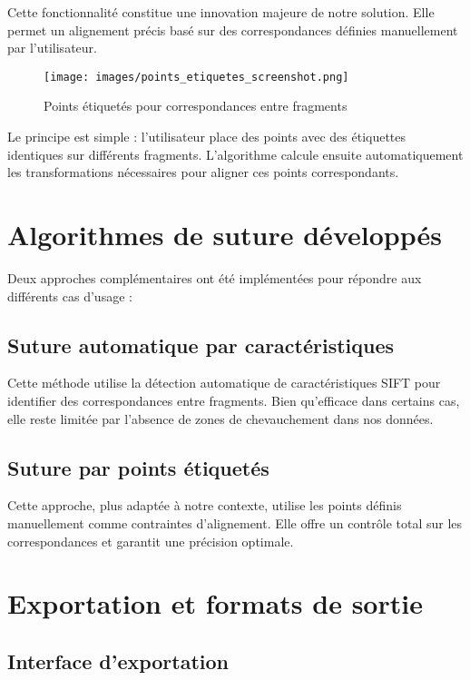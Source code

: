 \documentclass[11pt,a4paper]{report}
\begin{document}
Cette fonctionnalité constitue une innovation majeure de notre solution. Elle permet un alignement précis basé sur des correspondances définies manuellement par l'utilisateur.

\begin{figure}[htbp]
\centering
\texttt{[image: images/points\_etiquetes\_screenshot.png]}
\caption{Points étiquetés pour correspondances entre fragments}
\end{figure}

Le principe est simple : l'utilisateur place des points avec des étiquettes identiques sur différents fragments. L'algorithme calcule ensuite automatiquement les transformations nécessaires pour aligner ces points correspondants.

\section{Algorithmes de suture développés}

Deux approches complémentaires ont été implémentées pour répondre aux différents cas d'usage :

\subsection{Suture automatique par caractéristiques}

Cette méthode utilise la détection automatique de caractéristiques SIFT pour identifier des correspondances entre fragments. Bien qu'efficace dans certains cas, elle reste limitée par l'absence de zones de chevauchement dans nos données.

\subsection{Suture par points étiquetés}

Cette approche, plus adaptée à notre contexte, utilise les points définis manuellement comme contraintes d'alignement. Elle offre un contrôle total sur les correspondances et garantit une précision optimale.

\section{Exportation et formats de sortie}

\subsection{Interface d'exportation}
\end{document}
